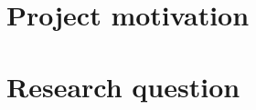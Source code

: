 
\section{Project motivation}
\label{chapter1-project-motivation}


\section{Research question}
\label{chapter1-research-question}


